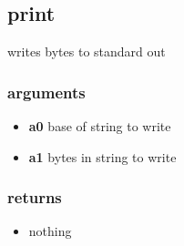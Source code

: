 \documentclass{article}
\begin{document}
\subsection*{print}
writes bytes to standard out

\subsubsection*{arguments}

\begin{itemize}
  \item \textbf{a0} base of string to write
  \item \textbf{a1} bytes in string to write
\end{itemize}

\subsubsection*{returns}

\begin{itemize}
  \item nothing
\end{itemize}
\end{document}

